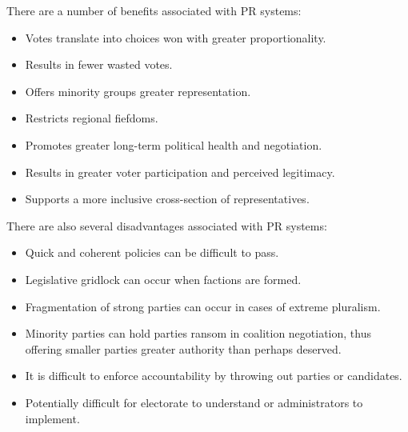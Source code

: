 
There are a number of benefits associated with PR systems:
\begin{itemize}
    \item Votes translate into choices won with greater proportionality.
    \item Results in fewer wasted votes.
    \item Offers minority groups greater representation.
    \item Restricts regional fiefdoms.
    \item Promotes greater long-term political health and negotiation.
    \item Results in greater voter participation and perceived legitimacy.
    \item Supports a more inclusive cross-section of representatives.
\end{itemize}

There are also several disadvantages associated with PR systems:
\begin{itemize}
    \item Quick and coherent policies can be difficult to pass.
    \item Legislative gridlock can occur when factions are formed.
    \item Fragmentation of strong parties can occur in cases of extreme
        pluralism.
    \item Minority parties can hold parties ransom in coalition negotiation,
        thus offering smaller parties greater authority than perhaps deserved.
    \item It is difficult to enforce accountability by throwing out parties or
        candidates.
    \item Potentially difficult for electorate to understand or administrators
        to implement.
\end{itemize}

